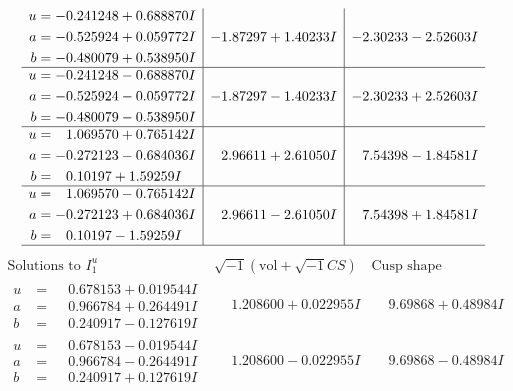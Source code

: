 \documentclass[1p]{elsarticle_modified}
\theoremstyle{definition}
\newcommand{\I}{\sqrt{-1}}
\begin{document}
$$\begin{array}{c|c|c}
\begin{aligned}
u &= -0.241248 + 0.688870 I \\
a &= -0.525924 + 0.059772 I \\
b &= -0.480079 + 0.538950 I\end{aligned}
 & -1.87297 + 1.40233 I & -2.30233 - 2.52603 I \\ \hline\begin{aligned}
u &= -0.241248 - 0.688870 I \\
a &= -0.525924 - 0.059772 I \\
b &= -0.480079 - 0.538950 I\end{aligned}
 & -1.87297 - 1.40233 I & -2.30233 + 2.52603 I \\ \hline\begin{aligned}
u &= \phantom{-}1.069570 + 0.765142 I \\
a &= -0.272123 - 0.684036 I \\
b &= \phantom{-}0.10197 + 1.59259 I\end{aligned}
 & \phantom{-}2.96611 + 2.61050 I & \phantom{-}7.54398 - 1.84581 I \\ \hline\begin{aligned}
u &= \phantom{-}1.069570 - 0.765142 I \\
a &= -0.272123 + 0.684036 I \\
b &= \phantom{-}0.10197 - 1.59259 I\end{aligned}
 & \phantom{-}2.96611 - 2.61050 I & \phantom{-}7.54398 + 1.84581 I\\
 \hline 
 \end{array}$$\newpage$$\begin{array}{c|c|c}  
\text{Solutions to }I^u_{1}& \I (\text{vol} + \sqrt{-1}CS) & \text{Cusp shape}\\
 \hline 
\begin{aligned}
u &= \phantom{-}0.678153 + 0.019544 I \\
a &= \phantom{-}0.966784 + 0.264491 I \\
b &= \phantom{-}0.240917 - 0.127619 I\end{aligned}
 & \phantom{-}1.208600 + 0.022955 I & \phantom{-}9.69868 + 0.48984 I \\ \hline\begin{aligned}
u &= \phantom{-}0.678153 - 0.019544 I \\
a &= \phantom{-}0.966784 - 0.264491 I \\
b &= \phantom{-}0.240917 + 0.127619 I\end{aligned}
 & \phantom{-}1.208600 - 0.022955 I & \phantom{-}9.69868 - 0.48984 I \\ \hline\begin{aligned}

\end{aligned}
\end{array}$$
\end{document}
